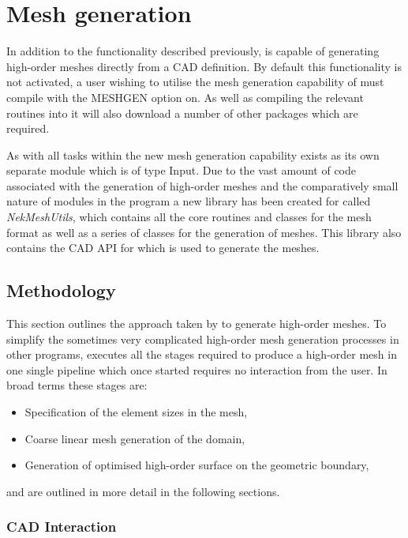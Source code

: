 \section{Mesh generation}

In addition to the functionality described previously, \mc is capable of
generating high-order meshes directly from a CAD definition.
By default this functionality is not activated, a user wishing to utilise the
mesh generation capability of \mc must compile \nekpp with the MESHGEN option
on. As well as compiling the relevant routines into \mc it will also download
a number of other packages which are required.

As with all tasks within \mc the new mesh generation capability exists as its
own separate module which is of type Input. Due to the vast amount of code
associated with the generation of high-order meshes and the comparatively small
nature of modules in the \mc program a new library has been created for \nekpp
called {\em NekMeshUtils}, which contains all the core routines and classes for
the \mc mesh format as well as a series of classes for the generation of meshes.
This library also contains the CAD API for \nekpp which is used to generate the
meshes.

\subsection{Methodology}

This section outlines the approach taken by \mc to generate high-order meshes.
%
To simplify the sometimes very complicated high-order mesh generation processes
in other programs, \mc executes all the stages required to produce a high-order
mesh in one single pipeline which once started requires no interaction from the
user. In broad terms these stages are:
\begin{itemize}
	\item Specification of the element sizes in the mesh,
	\item Coarse linear mesh generation of the domain,
	\item Generation of optimised high-order surface on the geometric boundary,
\end{itemize}
%
and are outlined in more detail in the following sections.

\subsubsection{CAD Interaction}

